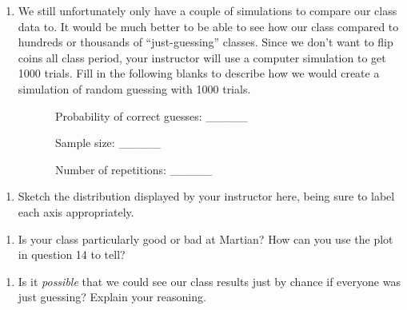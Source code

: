 \documentclass[
]{report}
\providecommand{\tightlist}{%
  \setlength{\itemsep}{0pt}\setlength{\parskip}{0pt}}
\begin{document}
\vspace{1in}

\begin{enumerate}
\def\labelenumi{\arabic{enumi}.}
\setcounter{enumi}{12}
\tightlist
\item
  We still unfortunately only have a couple of simulations to compare our class data to. It would be much better to be able to see how our class compared to hundreds or thousands of ``just-guessing'' classes. Since we don't want to flip coins all class period, your instructor will use a computer simulation to get 1000 trials. Fill in the following blanks to describe how we would create a simulation of random guessing with 1000 trials.
\end{enumerate}

~~~~~~~~~~Probability of correct guesses: \_\_\_\_\_

\vspace{0.1in}

~~~~~~~~~~Sample size: \_\_\_\_\_

\vspace{0.1in}

~~~~~~~~~~Number of repetitions: \_\_\_\_\_

\vspace{0.1in}

\begin{enumerate}
\def\labelenumi{\arabic{enumi}.}
\setcounter{enumi}{13}
\tightlist
\item
  Sketch the distribution displayed by your instructor here, being sure to label each axis appropriately.
\end{enumerate}

\vspace{2in}

\begin{enumerate}
\def\labelenumi{\arabic{enumi}.}
\setcounter{enumi}{14}
\tightlist
\item
  Is your class particularly good or bad at Martian? How can you use the plot in question 14 to tell?
\end{enumerate}

\vspace{1in}

\begin{enumerate}
\def\labelenumi{\arabic{enumi}.}
\setcounter{enumi}{15}
\tightlist
\item
  Is it \emph{possible} that we could see our class results just by chance if everyone was just guessing? Explain your reasoning.
\end{enumerate}
\end{document}
